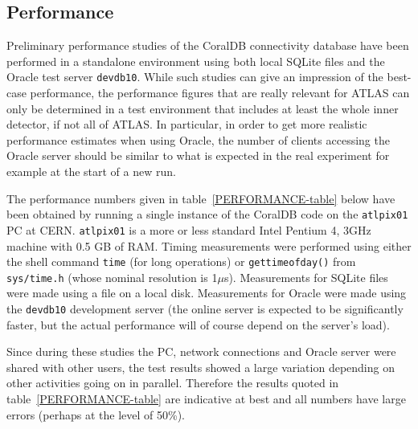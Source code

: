 
\subsection{Performance}
\label{performance}


Preliminary performance studies of the CoralDB connectivity database have been performed in a standalone
environment using both local SQLite files and the Oracle test server {\tt devdb10}. While such studies
can give an impression of the best-case performance, the performance figures that are really relevant for
ATLAS can only be determined in a test environment that includes at least the whole inner detector, if not
all of ATLAS. In particular, in order to get more realistic performance estimates when using Oracle, the number of clients
accessing the Oracle server should be similar to what is expected in the real experiment for example at the
start of a new run.

The performance numbers given in table~\ref{PERFORMANCE-table} below have been obtained by running a single instance
of the CoralDB code on the {\tt atlpix01} PC at CERN. {\tt atlpix01} is a more or less standard Intel Pentium 4, 3GHz machine with 0.5 GB of RAM. Timing measurements were performed using either the shell command {\tt time} (for long operations) or
{\tt gettimeofday()} from {\tt sys/time.h} (whose nominal resolution is 1$\mu$s). Measurements for SQLite files were
made using a file on a local disk. Measurements for Oracle were made using the {\tt devdb10} development server (the online server is expected to be significantly faster, but the actual performance will of course depend on the server's load).

Since during these studies the PC, network connections and Oracle server were shared with other users, the test results showed a large variation depending on other activities going on in parallel. Therefore the results quoted in
table~\ref{PERFORMANCE-table} are indicative at best and all numbers have large errors (perhaps at the level of 50\%). 


